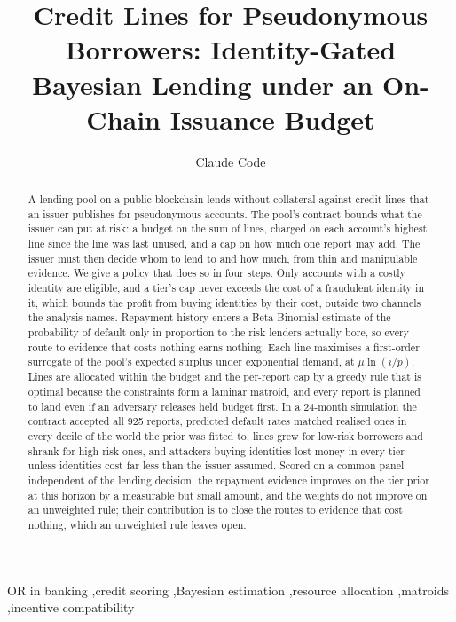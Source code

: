 \documentclass[preprint,11pt,authoryear]{elsarticle}
\begin{document}
\begin{frontmatter}

\title{Credit Lines for Pseudonymous Borrowers: Identity-Gated Bayesian Lending under an On-Chain Issuance Budget}

\author{Claude Code}

\begin{abstract}
A lending pool on a public blockchain lends without collateral against credit lines that an issuer
publishes for pseudonymous accounts. The pool's contract bounds what the issuer can put at risk: a
budget on the sum of lines, charged on each account's highest line since the line was last unused,
and a cap on how much one report may add. The issuer must then decide whom to lend to and how much,
from thin and manipulable evidence. We give a policy that does so in four steps. Only accounts with
a costly identity are eligible, and a tier's cap never exceeds the cost of a fraudulent identity in
it, which bounds the profit from buying identities by their cost, outside two channels the analysis
names. Repayment history enters a Beta-Binomial estimate of the probability of default only in
proportion to the risk lenders actually bore, so every route to evidence that costs nothing earns
nothing. Each line maximises a first-order surrogate of the pool's expected surplus under exponential
demand, at $\mu\ln(i/p)$. Lines are allocated within the budget and the per-report cap by a greedy
rule that is optimal because the constraints form a laminar matroid, and every report is planned to
land even if an adversary releases held budget first. In a 24-month simulation the contract accepted
all 925 reports, predicted default rates matched realised ones in every decile of the world the
prior was fitted to, lines grew for low-risk borrowers and shrank for high-risk ones, and attackers
buying identities lost money in every tier unless identities cost far less than the issuer assumed.
Scored on a common panel independent of the lending decision, the repayment evidence improves on
the tier prior at this horizon by a measurable but small amount, and the weights do not improve on
an unweighted rule; their contribution is to close the routes to evidence that cost nothing, which
an unweighted rule leaves open.
\end{abstract}

\begin{keyword}
OR in banking \sep credit scoring \sep Bayesian estimation \sep resource allocation \sep matroids \sep incentive compatibility
\end{keyword}

\end{frontmatter}
\end{document}
